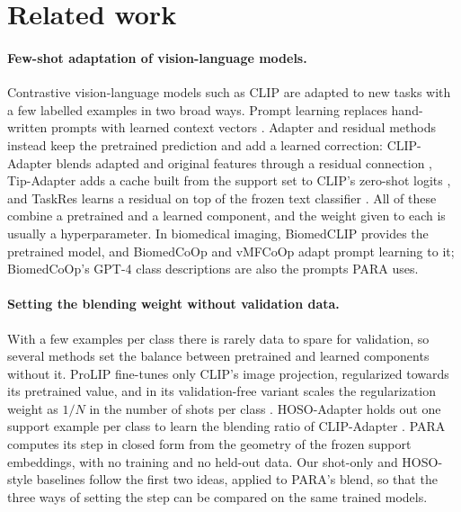 \section{Related work}\label{sec:related}

\paragraph{Few-shot adaptation of vision-language models.}
Contrastive vision-language models such as CLIP \citep{radford2021clip} are adapted to new tasks with a few labelled examples in two broad ways.
Prompt learning replaces hand-written prompts with learned context vectors \citep{zhou2022coop}.
Adapter and residual methods instead keep the pretrained prediction and add a learned correction:
CLIP-Adapter blends adapted and original features through a residual connection \citep{gao2024clipadapter},
Tip-Adapter adds a cache built from the support set to CLIP's zero-shot logits \citep{zhang2022tipadapter},
and TaskRes learns a residual on top of the frozen text classifier \citep{yu2023taskres}.
All of these combine a pretrained and a learned component, and the weight given to each is usually a hyperparameter.
In biomedical imaging, BiomedCLIP \citep{zhang2023biomedclip} provides the pretrained model,
and BiomedCoOp \citep{koleilat2025biomedcoop} and vMFCoOp \citep{shao2026vmfcoop} adapt prompt learning to it;
BiomedCoOp's GPT-4 class descriptions are also the prompts PARA uses.

\paragraph{Setting the blending weight without validation data.}
With a few examples per class there is rarely data to spare for validation, so several methods set the balance between pretrained and learned components without it.
ProLIP fine-tunes only CLIP's image projection, regularized towards its pretrained value,
and in its validation-free variant scales the regularization weight as $1/N$ in the number of shots per class \citep{fahes2026prolip}.
HOSO-Adapter holds out one support example per class to learn the blending ratio of CLIP-Adapter \citep{vorster2026hoso}.
PARA \citep{kang2026para} computes its step in closed form from the geometry of the frozen support embeddings, with no training and no held-out data.
Our shot-only and HOSO-style baselines follow the first two ideas, applied to PARA's blend, so that the three ways of setting the step can be compared on the same trained models.

